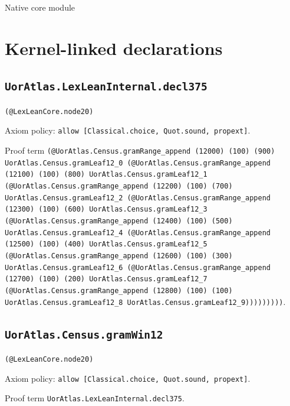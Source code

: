 \documentclass[11pt]{article}
\begin{document}
\begin{center}{\LARGE Native core module}\end{center}
\section*{Kernel-linked declarations}
\subsection*{\texttt{UorAtlas.LexLeanInternal.decl375}}
\noindent\texttt{(@LexLeanCore.node20)}\par
\noindent Axiom policy: \texttt{allow [Classical.choice, Quot.sound, propext]}.\par
\noindent Proof term \texttt{(@UorAtlas.Census.gramRange\_append (12000) (100) (900) UorAtlas.Census.gramLeaf12\_0 (@UorAtlas.Census.gramRange\_append (12100) (100) (800) UorAtlas.Census.gramLeaf12\_1 (@UorAtlas.Census.gramRange\_append (12200) (100) (700) UorAtlas.Census.gramLeaf12\_2 (@UorAtlas.Census.gramRange\_append (12300) (100) (600) UorAtlas.Census.gramLeaf12\_3 (@UorAtlas.Census.gramRange\_append (12400) (100) (500) UorAtlas.Census.gramLeaf12\_4 (@UorAtlas.Census.gramRange\_append (12500) (100) (400) UorAtlas.Census.gramLeaf12\_5 (@UorAtlas.Census.gramRange\_append (12600) (100) (300) UorAtlas.Census.gramLeaf12\_6 (@UorAtlas.Census.gramRange\_append (12700) (100) (200) UorAtlas.Census.gramLeaf12\_7 (@UorAtlas.Census.gramRange\_append (12800) (100) (100) UorAtlas.Census.gramLeaf12\_8 UorAtlas.Census.gramLeaf12\_9)))))))))}.\par
\subsection*{\texttt{UorAtlas.Census.gramWin12}}
\noindent\texttt{(@LexLeanCore.node20)}\par
\noindent Axiom policy: \texttt{allow [Classical.choice, Quot.sound, propext]}.\par
\noindent Proof term \texttt{UorAtlas.LexLeanInternal.decl375}.\par
\end{document}
